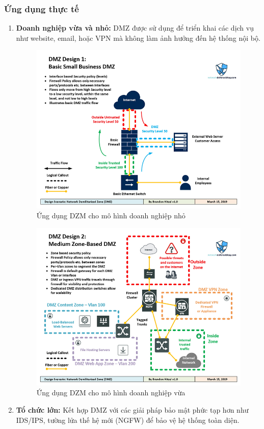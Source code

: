 \documentclass[13pt]{article}
\begin{document}
\subsubsection{Ứng dụng thực tế}
\begin{enumerate}
    \item \textbf{Doanh nghiệp vừa và nhỏ: }DMZ được sử dụng để triển khai các dịch vụ như website, email, hoặc VPN mà không làm ảnh hưởng đến hệ thống nội bộ.

    \begin{figure}[h!]
        \centering
        \includegraphics[width=0.7\linewidth]{image/20.png}
            \caption{Ứng dụng DZM cho mô hình doanh nghiệp nhỏ}
            \label{fig:label1}
    \end{figure}

    \begin{figure}[h!]
        \centering
        \includegraphics[width=0.7\linewidth]{image/21.png}
            \caption{Ứng dụng DZM cho mô hình doanh nghiệp vừa}
            \label{fig:label1}
    \end{figure}
    
    \item \textbf{Tổ chức lớn: }Kết hợp DMZ với các giải pháp bảo mật phức tạp hơn như IDS/IPS, tường lửa thế hệ mới (NGFW) để bảo vệ hệ thống toàn diện.


\end{enumerate}
\end{document}
